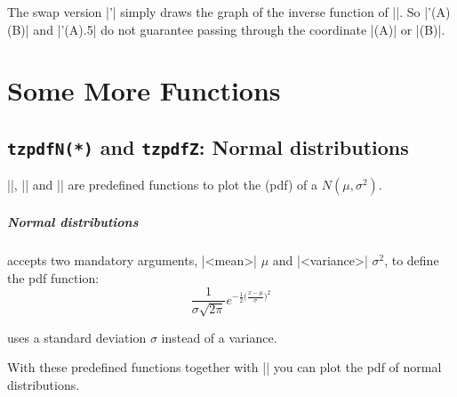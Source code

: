 \remark The swap version |\tzfnofy'| simply draws the graph of the inverse function of |\tzfnofy|.
So |\tzfnofy'(A)(B)| and |\tzfnofy'(A){.5}| do not guarantee passing through the coordinate |(A)| or |(B)|.

\begin{tzcode}{.3}
\end{tzcode}



\chapter{Some More Functions}
\label{c:more-fn}

\section{\texttt{\bs tzpdfN(*)} and \texttt{\bs tzpdfZ}: Normal distributions}
\label{s:normaldistributions}


|\tzpdfN|, |\tzpdfN*| and |\tzpdfZ| are predefined functions to plot the  (pdf) of a  $N(\mu,\sigma^2)$.

\paragraph{Normal distributions}
\icmd{\tzpdfN} accepts two mandatory arguments, |{<mean>}| $\mu$ and |{<variance>}| $\sigma^2$, to define the pdf function:
\[
  \frac{1}{\sigma\sqrt{2\pi}} e^{-\frac12\big(\frac{x-\mu}{\sigma}\big)^2}
\]

\icmd{\tzpdfN*} uses a standard deviation $\sigma$ instead of a variance.

With these predefined functions together with |\tzfn| you can plot the pdf of normal distributions.

\begin{tzcode}{.3}
{}
\end{tzcode}



